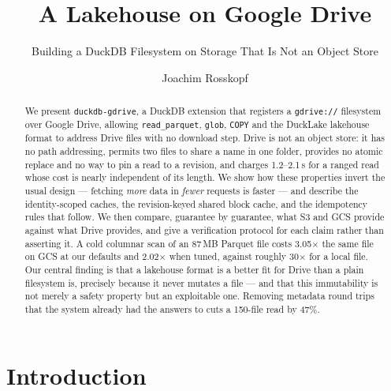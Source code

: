 \documentclass[sigconf, nonacm]{acmart}
\begin{document}
\title{A Lakehouse on Google Drive}
\subtitle{Building a DuckDB Filesystem on Storage That Is Not an Object Store}

\author{Joachim Rosskopf}

\begin{abstract}
We present \texttt{duckdb-gdrive}, a DuckDB extension that registers a
\texttt{gdrive://} filesystem over Google Drive, allowing
\texttt{read\_parquet}, \texttt{glob}, \texttt{COPY} and the DuckLake
lakehouse format to address Drive files with no download step. Drive is not an
object store: it has no path addressing, permits two files to share a name in
one folder, provides no atomic replace and no way to pin a read to a revision,
and charges 1.2--2.1\,s for a ranged read whose cost is nearly independent of
its length. We show how these properties invert the usual design --- fetching
\emph{more} data in \emph{fewer} requests is faster --- and describe the
identity-scoped caches, the revision-keyed shared block cache, and the
idempotency rules that follow. We then compare, guarantee by guarantee, what
S3 and GCS provide against what Drive provides, and give a verification
protocol for each claim rather than asserting it. A cold columnar scan of an
87\,MB Parquet file costs 3.05$\times$ the same file on GCS at our defaults and
2.02$\times$ when tuned, against roughly 30$\times$ for a local file. Our central
finding is that a lakehouse format is a better fit for Drive than a plain
filesystem is, precisely because it never mutates a file --- and that this
immutability is not merely a safety property but an exploitable one. Removing
metadata round trips that the system already had the answers to cuts a
150-file read by 47\%.
\end{abstract}

\maketitle

\section{Introduction}
\end{document}
